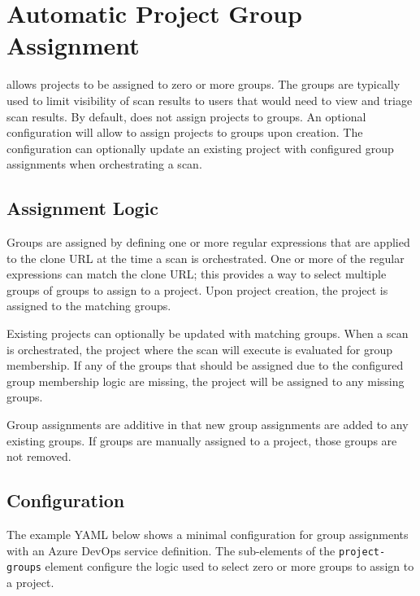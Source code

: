 \chapter{Automatic Project Group Assignment}\label{sec:project-groups}

\cxone allows projects to be assigned to zero or more groups.  The groups are typically
used to limit visibility of scan results to users that would need to view and triage
scan results.  By default, \cxoneflow does not assign projects to groups.  An optional
configuration will allow \cxoneflow to assign projects to groups upon creation.  The
configuration can optionally update an existing project with configured group assignments
when orchestrating a scan.


\section{Assignment Logic}

Groups are assigned by defining one or more regular expressions that are applied to the clone
URL at the time a scan is orchestrated.  One or more of the regular expressions can match
the clone URL; this provides a way to select multiple groups of groups to assign to a project.
Upon project creation, the project is assigned to the matching groups.

Existing projects can optionally be updated with matching groups.  When a scan is orchestrated, the
project where the scan will execute is evaluated for group membership.  If any of the groups that
should be assigned due to the configured group membership logic are missing, the project will be
assigned to any missing groups.

Group assignments are additive in that new group assignments are added to any existing groups. If
groups are manually assigned to a project, those groups are not removed.  


\section{Configuration}

The example YAML below shows a minimal configuration for group assignments
with an Azure DevOps service definition.  The sub-elements of the \texttt{project-groups}
element configure the logic used to select zero or more groups to assign to a
\cxone project.




